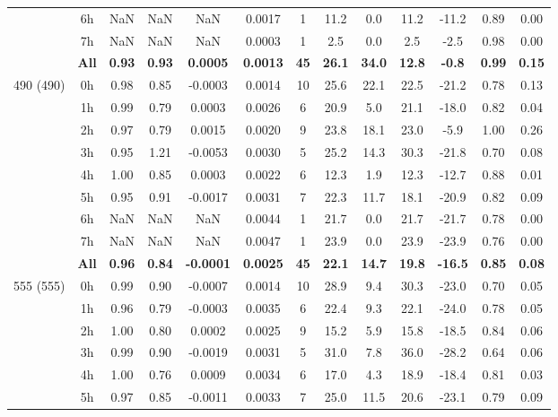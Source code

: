 \documentclass[preview]{standalone}
\begin{document}
\begin{tabular}{ccccccccccccc}
 & 6h   & NaN & NaN & NaN & 0.0017 &  1 & 11.2 & 0.0 & 11.2 & -11.2 & 0.89 & 0.00 \\ 
 & 7h   & NaN & NaN & NaN & 0.0003 &  1 & 2.5 & 0.0 & 2.5 & -2.5 & 0.98 & 0.00 \\ \cline{2-13}
 & \textbf{All}  & \textbf{0.93} & \textbf{0.93} & \textbf{0.0005} & \textbf{0.0013} & \textbf{45} & \textbf{26.1} & \textbf{34.0} & \textbf{12.8} & \textbf{-0.8} & \textbf{0.99} & \textbf{0.15} \\ \hline
\multirow{9}{*}{490 (490)} & 0h  & 0.98 & 0.85 & -0.0003 & 0.0014 & 10 & 25.6 & 22.1 & 22.5 & -21.2 & 0.78 & 0.13 \\ 
 & 1h   & 0.99 & 0.79 & 0.0003 & 0.0026 &  6 & 20.9 & 5.0 & 21.1 & -18.0 & 0.82 & 0.04 \\ 
 & 2h   & 0.97 & 0.79 & 0.0015 & 0.0020 &  9 & 23.8 & 18.1 & 23.0 & -5.9 & 1.00 & 0.26 \\ 
 & 3h   & 0.95 & 1.21 & -0.0053 & 0.0030 &  5 & 25.2 & 14.3 & 30.3 & -21.8 & 0.70 & 0.08 \\ 
 & 4h   & 1.00 & 0.85 & 0.0003 & 0.0022 &  6 & 12.3 & 1.9 & 12.3 & -12.7 & 0.88 & 0.01 \\ 
 & 5h   & 0.95 & 0.91 & -0.0017 & 0.0031 &  7 & 22.3 & 11.7 & 18.1 & -20.9 & 0.82 & 0.09 \\ 
 & 6h   & NaN & NaN & NaN & 0.0044 &  1 & 21.7 & 0.0 & 21.7 & -21.7 & 0.78 & 0.00 \\ 
 & 7h   & NaN & NaN & NaN & 0.0047 &  1 & 23.9 & 0.0 & 23.9 & -23.9 & 0.76 & 0.00 \\ \cline{2-13}
 & \textbf{All}  & \textbf{0.96} & \textbf{0.84} & \textbf{-0.0001} & \textbf{0.0025} & \textbf{45} & \textbf{22.1} & \textbf{14.7} & \textbf{19.8} & \textbf{-16.5} & \textbf{0.85} & \textbf{0.08} \\ \hline
\multirow{9}{*}{555 (555)} & 0h  & 0.99 & 0.90 & -0.0007 & 0.0014 & 10 & 28.9 & 9.4 & 30.3 & -23.0 & 0.70 & 0.05 \\ 
 & 1h   & 0.96 & 0.79 & -0.0003 & 0.0035 &  6 & 22.4 & 9.3 & 22.1 & -24.0 & 0.78 & 0.05 \\ 
 & 2h   & 1.00 & 0.80 & 0.0002 & 0.0025 &  9 & 15.2 & 5.9 & 15.8 & -18.5 & 0.84 & 0.06 \\ 
 & 3h   & 0.99 & 0.90 & -0.0019 & 0.0031 &  5 & 31.0 & 7.8 & 36.0 & -28.2 & 0.64 & 0.06 \\ 
 & 4h   & 1.00 & 0.76 & 0.0009 & 0.0034 &  6 & 17.0 & 4.3 & 18.9 & -18.4 & 0.81 & 0.03 \\ 
 & 5h   & 0.97 & 0.85 & -0.0011 & 0.0033 &  7 & 25.0 & 11.5 & 20.6 & -23.1 & 0.79 & 0.09 \\ 

\end{tabular}
\end{document}
